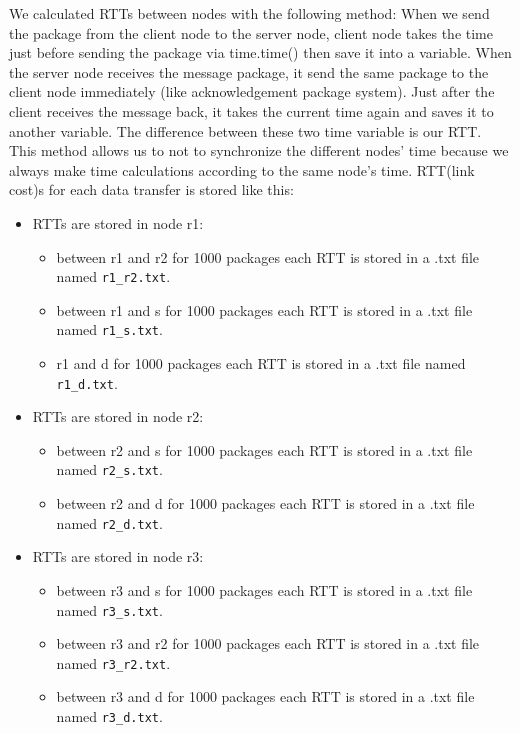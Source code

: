 \documentclass[conference]{IEEEtran}
\begin{document}
We calculated RTTs between nodes with the following method: When we send the package from the client node to the server node, client node takes the time just before sending the package via time.time() then save it into a variable. When the server node receives the message package, it send the same package to the client node immediately (like acknowledgement package system). Just after the client receives the message back, it takes the current time again and saves it to another variable. The difference between these two time variable is our RTT. This method allows us to not to synchronize the different nodes' time because we always make time calculations according to the same node's time. RTT(link cost)s for each data transfer is stored like this:
\begin{itemize}
    
    \item RTTs are stored in node r1:
    \begin{itemize}
        \item between r1 and r2 for 1000 packages each RTT is stored in a .txt file named \verb|r1_r2.txt|.
        \item between r1 and s for 1000 packages each RTT is stored in a .txt file named \verb|r1_s.txt|.
        \item r1 and d for 1000 packages each RTT is stored in a .txt file named \verb|r1_d.txt|.
    \end{itemize}
    
    \item RTTs are stored in node r2:
    \begin{itemize}
        \item between r2 and s for 1000 packages each RTT is stored in a .txt file named \verb|r2_s.txt|.
        \item between r2 and d for 1000 packages each RTT is stored in a .txt file named \verb|r2_d.txt|.
    \end{itemize}
    
    \item RTTs are stored in node r3:
    \begin{itemize}
        \item between r3 and s for 1000 packages each RTT is stored in a .txt file named \verb|r3_s.txt|.
        \item between r3 and r2 for 1000 packages each RTT is stored in a .txt file named \verb|r3_r2.txt|.
        \item between r3 and d for 1000 packages each RTT is stored in a .txt file named \verb|r3_d.txt|.
    \end{itemize}
\end{itemize}
\end{document}
